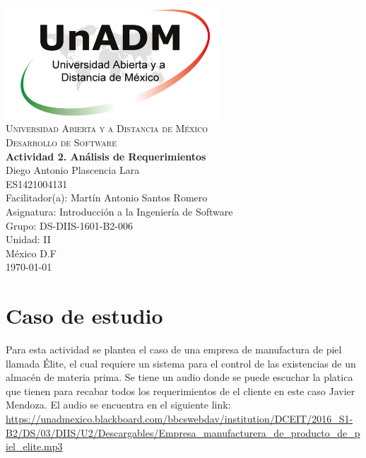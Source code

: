 \documentclass[spanish,12pt,letterpapper]{article}
\begin{document}
	\begin{titlepage}
		\begin{center}
			\includegraphics[width=0.6\textwidth]{../logoUnADM}~\\[1cm] 
			\textsc{Universidad Abierta y a Distancia de México}\\[0.8cm]
			\textsc{Desarrollo de Software}\\[1.8cm]
			
			\textbf{ \Large Actividad 2. Análisis de Requerimientos}\\[3cm]
			
			Diego Antonio Plascencia Lara\\ ES1421004131 \\[0.4cm]
			Facilitador(a): Martín Antonio Santos Romero\\
			Asignatura: Introducción a la Ingeniería de Software\\
			Grupo: DS-DIIS-1601-B2-006 \\
			Unidad: II \\
			
			\vfill México D.F\\{\today}
			
		\end{center}
	\end{titlepage}
	
	\section{Caso de estudio}
	Para esta actividad se plantea el caso de una empresa de manufactura de piel llamada Élite, el cual requiere un sistema para el control de las existencias de un almacén de materia prima. Se tiene un audio donde se puede escuchar la platica que tienen para recabar todos los requerimientos de el cliente en este caso Javier Mendoza. El audio se encuentra en el siguiente link:\\
	\url{https://unadmexico.blackboard.com/bbcswebdav/institution/DCEIT/2016_S1-B2/DS/03/DIIS/U2/Descargables/Empresa_manufacturera_de_producto_de_piel_elite.mp3}
	
\end{document}
